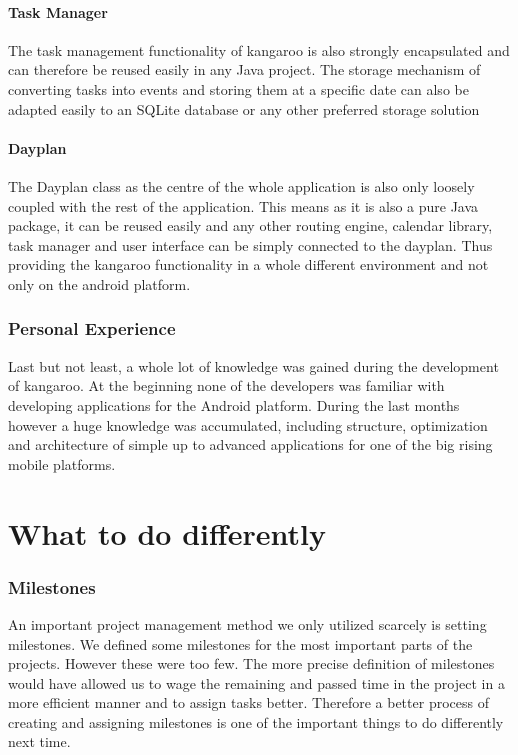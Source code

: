 \paragraph{Task Manager}
The task management functionality of kangaroo is also strongly encapsulated and
can therefore be reused easily in any Java project. The storage mechanism of
converting tasks into events and storing them at a specific date can also be
adapted easily to an SQLite database or any other preferred storage solution

\paragraph{Dayplan}
The Dayplan class as the centre of the whole application is also only loosely
coupled with the rest of the application. This means as it is also a pure Java
package, it can be reused easily and any other routing engine, calendar library,
task manager and user interface can be simply connected to the dayplan. Thus
providing the kangaroo functionality in a whole different environment and not
only on the android platform.

\subsubsection{Personal Experience} %
\label{ssub:Personal Experience}
Last but not least, a whole lot of knowledge was gained during the development
of kangaroo. At the beginning none of the developers was familiar with
developing applications for the Android platform. During the last months however
a huge knowledge was accumulated, including structure, optimization and
architecture of simple up to advanced applications for one of the big rising
mobile platforms.


\section{What to do differently} %
\label{sec:Whattododifferently}
\subsubsection{Milestones} %
\label{ssub:Milestones}
An important project management method we only utilized scarcely is setting
milestones. We defined some milestones for the most important parts of the
projects. However these were too few. The more precise definition of milestones
would have allowed us to wage the remaining and passed time in the project in a
more efficient manner and to assign tasks better. Therefore a better process of
creating and assigning milestones is one of the important things to do
differently next time.

